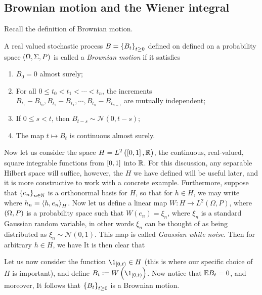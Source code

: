 \documentclass[../main.tex]{subfiles}
\begin{document}
\subsection{Brownian motion and the Wiener integral}
Recall the definition of Brownian motion.
\begin{definition}
\label{def:brownian_motion}
A real valued stochastic process $B = \cbr{B_t}_{t\geq0}$ defined on defined on a probability space $\del{\Omega,\Sigma,P}$ is called a \emph{Brownian motion} if it satisfies \begin{enumerate}
    \item $B_0 = 0$ almost surely;
    \item For all $0 \leq t_0<t_1<\cdots<t_n$, the increments $B_{t_1} - B_{t_0}, B_{t_2} - B_{t_1}, \cdots, B_{t_n}-B_{t_{n-1}}$ are mutually independent;
    \item If $0\leq s<t$, then $B_{t-s}\sim\mathcal{N}(0,t-s)$;
    \item The map $t\mapsto B_t$ is continuous almost surely.
\end{enumerate}
\end{definition}

Now let us consider the space $H = L^2\del{\intcc{0,1},\R}$, the continuous, real-valued, square integrable functions from $\intcc{0,1}$ into $\operatorname{\mathbb{R}}$. For this discussion, any separable Hilbert space will suffice, however, the $H$ we have defined will be useful later, and it is more constructive to work with a concrete example. Furthermore, suppose that $\cbr{e_n}_{n\in\N}$ is a orthonormal basis for $H$, so that for $h\in H$, we may write  where $h_n = \left\langle h,e_n \right\rangle_H$. Now let us define a linear map $W:H\to L^2(\Omega, P)$, where $\del{\Omega,P}$ is a probability space such that $W(e_n) = \xi_n$, where $\xi_n$ is a standard Gaussian random variable, in other words $\xi_n$ can be thought of as being distributed as $\xi_n\sim\mathcal{N}(0,1)$. This map is called \emph{Gaussian white noise}. Then for arbitrary $h\in H$, we have  It is then clear that 

Let us now consider the function $\1_{\intco{0,t}}\in H$ (this is where our specific choice of $H$ is important), and define $B_t := W\del{\1_{\intco{0,t}}}$. Now notice that $\mathbb{E} B_t = 0$, and moreover,  It follows that $\cbr{B_t}_{t\geq0}$ is a Brownian motion. 
\end{document}
